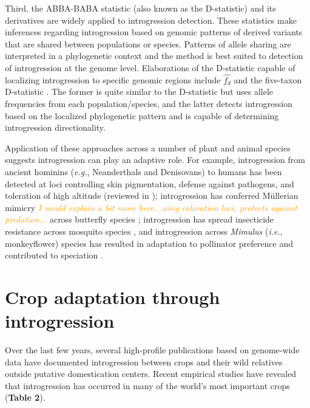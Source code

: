 \documentclass[11pt]{article}
\newcommand{\mbh}[1]{\textcolor{orange}{ \emph{\scriptsize  #1}} } %
\begin{document}
Third, the ABBA-BABA statistic (also known as the D-statistic) and its derivatives are widely applied to introgression detection.
These statistics make inferences regarding introgression based on genomic patterns of derived variants that are shared between populations or species.
Patterns of allele sharing are interpreted in a phylogenetic context and the method is best suited to detection of introgression at the genome level.
Elaborations of the D-statistic capable of localizing introgression to specific genomic regions include $\hat{f_{d}}$ \cite{Martin2015} and the five-taxon D-statistic \cite{pease2015}. 
The former is quite similar to the D-statistic but uses allele frequencies from each population/species, and the latter detects introgression based on the localized phylogenetic pattern and is capable of determining introgression directionality.

Application of these approaches across a number of plant and animal species suggests introgression can play an adaptive role. For example, introgression from ancient hominins (\emph{e.g.}, Neanderthals and Denisovans) to humans has been detected at loci controlling skin pigmentation, defense against pathogens, and toleration of high altitude (reviewed in \cite{Racimo2015}); introgression has conferred M\"{u}llerian mimicry \mbh{I would explain a bit more here...wing coloration loci, protects against predation...} across butterfly species \cite{Heliconius2012}; introgression has spread insecticide resistance across mosquito species \cite{Norris2015}, and introgression across \emph{Mimulus} (\emph{i.e.}, monkeyflower) species has resulted in adaptation to pollinator preference and contributed to speciation \cite{Stankowski2015}.






\section*{Crop adaptation through introgression}


Over the last few years, several high-profile publications based on genome-wide data have documented introgression between crops and their wild relatives outside putative domestication centers.
Recent empirical studies have revealed that introgression has occurred in many of the world's most important crops (\textbf{Table 2}).
\end{document}
